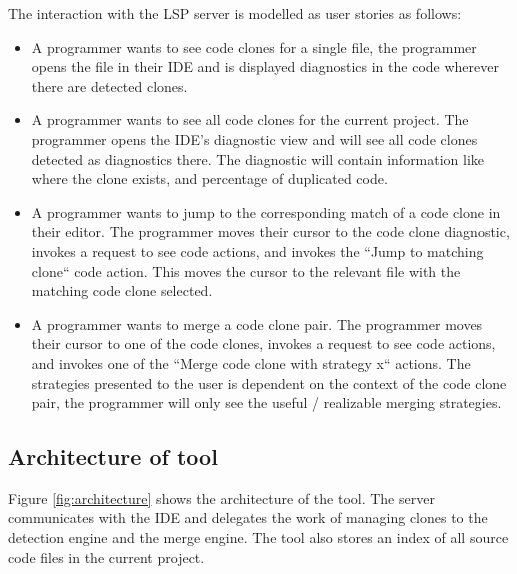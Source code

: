 \documentclass[12pt]{article}
\begin{document}
The interaction with the LSP server is modelled as user stories as follows:

\begin{itemize}
	\item A programmer wants to see code clones for a single file, the
	      programmer opens the file in their IDE and is displayed diagnostics in the code
	      wherever there are detected clones.

	\item A programmer wants to see all code clones for the current project. The
	      programmer opens the IDE's diagnostic view and will see all code clones detected
	      as diagnostics there. The diagnostic will contain information like where the clone
	      exists, and percentage of duplicated code.

	\item A programmer wants to jump to the corresponding match of a code clone in their
	      editor. The programmer moves their cursor to the code clone diagnostic, invokes a
	      request to see code actions, and invokes the ``Jump to matching clone`` code
	      action. This moves the cursor to the relevant file with the matching code clone
	      selected.

	\item A programmer wants to merge a code clone pair. The programmer moves their cursor
	      to one of the code clones, invokes a request to see code actions, and invokes one
	      of the ``Merge code clone with strategy x`` actions. The strategies presented to
	      the user is dependent on the context of the code clone pair, the programmer will
	      only see the useful / realizable merging strategies.
\end{itemize}

\subsection{Architecture of tool}

Figure \ref{fig:architecture} shows the architecture of the tool. The server communicates
with the IDE and delegates the work of managing clones to the detection engine and the
merge engine. The tool also stores an index of all source code files in the current project.
\end{document}
